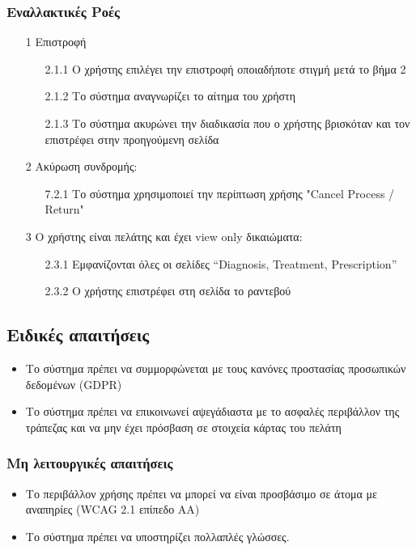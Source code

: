 \documentclass[12pt,a4paper,twoside]{book}
\begin{document}
\subsubsection{Εναλλακτικές Ροές}
\begin{enumerate}
  \item[1 ] Επιστροφή
        \begin{enumerate}
          \item[2.1.1 ] Ο χρήστης επιλέγει την επιστροφή οποιαδήποτε στιγμή μετά το βήμα 2 %
          \item[2.1.2 ] Το σύστημα αναγνωρίζει το αίτημα του χρήστη %
          \item[2.1.3 ] Το σύστημα ακυρώνει την διαδικασία που ο χρήστης βρισκόταν και τον επιστρέφει στην προηγούμενη σελίδα %
        \end{enumerate}
  \item[2 ] Ακύρωση συνδρομής:   %
        \begin{enumerate}
          \item[7.2.1 ] Το σύστημα χρησιμοποιεί την περίπτωση χρήσης "Cancel Process / Return" %
        \end{enumerate}
  \item[3 ] Ο χρήστης είναι πελάτης και έχει view only δικαιώματα:  %
        \begin{enumerate}
          \item[2.3.1 ] Εμφανίζονται όλες οι σελίδες “Diagnosis, Treatment, Prescription” %
          \item[2.3.2 ] Ο χρήστης επιστρέφει στη σελίδα το ραντεβού  %
        \end{enumerate}
\end{enumerate}

\subsection{Ειδικές απαιτήσεις} %
\begin{itemize}
  \item Το σύστημα πρέπει να συμμορφώνεται με τους κανόνες προστασίας προσωπικών δεδομένων (GDPR)  %
  \item Το σύστημα πρέπει να επικοινωνεί αψεγάδιαστα με το ασφαλές περιβάλλον της τράπεζας και να μην έχει πρόσβαση σε στοιχεία κάρτας του πελάτη   %
\end{itemize}

\subsubsection{Μη λειτουργικές απαιτήσεις}
\begin{itemize}
  \item Το περιβάλλον χρήσης πρέπει να μπορεί να  είναι προσβάσιμο σε  άτομα με αναπηρίες (WCAG 2.1 επίπεδο AA) %
  \item Το σύστημα πρέπει να υποστηρίζει πολλαπλές γλώσσες.
\end{itemize}
\end{document}
